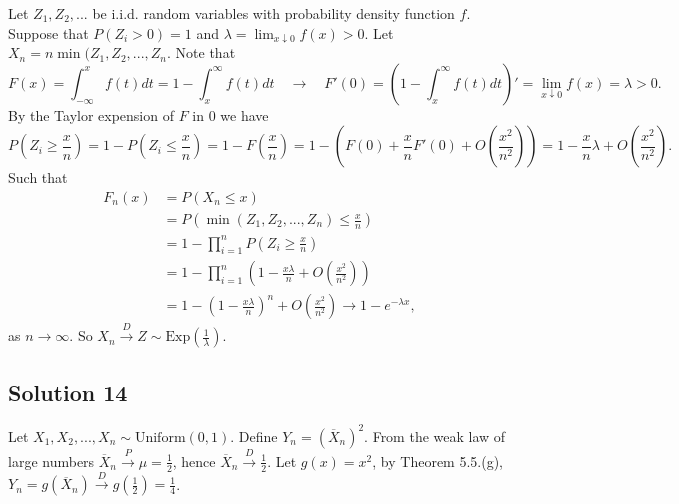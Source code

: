 Let $Z_1, Z_2, ...$ be i.i.d. random variables with probability density function $f$.
Suppose that $P(Z_i > 0) = 1$ and $\lambda = \lim_{x \downarrow 0} f(x) > 0$.
Let $X_n = n \min(Z_1, Z_2, ..., Z_n$.
Note that
\begin{equation*}
    F(x) = \int_{-\infty}^{x} f(t) dt
        = 1 - \int_{x}^{\infty} f(t) dt
        \quad \rightarrow \quad
    F'(0) = \left( 1 - \int_{x}^{\infty} f(t) dt \right)'
        = \lim_{x \downarrow 0} f(x)
        = \lambda > 0.
\end{equation*}
By the Taylor expension of $F$ in $0$ we have
\begin{equation*}
    P(Z_i \geq \frac{x}{n}) = 1 - P(Z_i \leq \frac{x}{n})
        = 1 - F(\frac{x}{n})
        = 1 - (F(0) + \frac{x}{n} F'(0) + O(\frac{x^2}{n^2}))
        = 1 - \frac{x}{n} \lambda + O(\frac{x^2}{n^2}).
\end{equation*}
Such that
\begin{equation*}
    \begin{split}
        F_n(x)
            &= P\left(X_n \leq x\right) \\
            &= P\left(\min(Z_1, Z_2, ..., Z_n) \leq \frac{x}{n}\right) \\
            &= 1 - \prod_{i = 1}^n P\left(Z_i \geq \frac{x}{n}\right) \\
            &= 1 - \prod_{i = 1}^n \left(1 - \frac{x \lambda}{n} + O(\frac{x^2}{n^2})\right) \\
            &= 1 - \left(1 - \frac{x \lambda}{n}\right)^n + O\left(\frac{x^2}{n^2}\right)
            \to 1 - e^{-\lambda x},
    \end{split}
\end{equation*}
as $n \to \infty$.
So $X_n \xrightarrow{D} Z \sim \mathrm{Exp}(\frac{1}{\lambda})$.


\subsection*{Solution 14}

Let $X_1, X_2, ..., X_n \sim \mathrm{Uniform}(0, 1)$.
Define $Y_n = (\overline{X}_n)^2$.
From the weak law of large numbers $\overline{X}_n \xrightarrow{P} \mu = \frac{1}{2}$, hence $\overline{X}_n \xrightarrow{D} \frac{1}{2}$.
Let $g(x) = x^2$, by Theorem 5.5.(g), $Y_n = g(\overline{X}_n) \xrightarrow{D} g(\frac{1}{2}) = \frac{1}{4}$.
